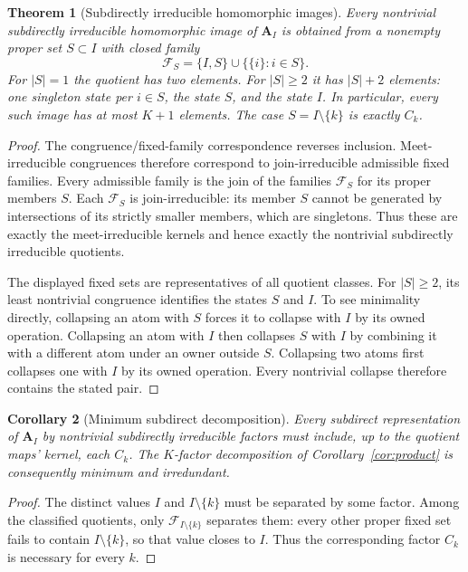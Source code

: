\documentclass[11pt]{article}
\newtheorem{theorem}{Theorem}[section]
\newtheorem{corollary}[theorem]{Corollary}
\newcommand{\A}{\mathbf A_I}
\begin{document}
\begin{theorem}[Subdirectly irreducible homomorphic images]\label{thm:si}
Every nontrivial subdirectly irreducible homomorphic image of $\A$ is
obtained from a nonempty proper set $S\subset I$ with closed family
\[
 \mathcal F_S=\{I,S\}\cup\{\{i\}:i\in S\}.
\]
For $|S|=1$ the quotient has two elements. For $|S|\geq2$ it has
$|S|+2$ elements: one singleton state per $i\in S$, the state $S$, and
the state $I$. In particular, every such image has at most $K+1$ elements.
The case $S=I\setminus\{k\}$ is exactly $C_k$.
\end{theorem}
\begin{proof}
The congruence/fixed-family correspondence reverses inclusion.
Meet-irreducible congruences therefore correspond to join-irreducible
admissible fixed families. Every admissible family is the join of the
families $\mathcal F_S$ for its proper members $S$. Each
$\mathcal F_S$ is join-irreducible: its member $S$ cannot be generated by
intersections of its strictly smaller members, which are singletons.
Thus these are exactly the meet-irreducible kernels and hence exactly the
nontrivial subdirectly irreducible quotients.

The displayed fixed sets are representatives of all quotient classes.
For $|S|\geq2$, its least nontrivial congruence identifies the states $S$
and $I$. To see minimality directly, collapsing an atom with $S$ forces
it to collapse with $I$ by its owned operation. Collapsing an atom with
$I$ then collapses $S$ with $I$ by combining it with a different atom
under an owner outside $S$. Collapsing two atoms first collapses one
with $I$ by its owned operation. Every nontrivial collapse therefore
contains the stated pair.
\end{proof}

\begin{corollary}[Minimum subdirect decomposition]
Every subdirect representation of $\A$ by nontrivial subdirectly
irreducible factors must include, up to the quotient maps' kernel,
each $C_k$. The $K$-factor decomposition of
Corollary~\ref{cor:product} is consequently minimum and irredundant.
\end{corollary}
\begin{proof}
The distinct values $I$ and $I\setminus\{k\}$ must be separated by some
factor. Among the classified quotients, only
$\mathcal F_{I\setminus\{k\}}$ separates them: every other proper
fixed set fails to contain $I\setminus\{k\}$, so that value closes to
$I$. Thus the corresponding factor $C_k$ is necessary for every $k$.
\end{proof}
\end{document}
